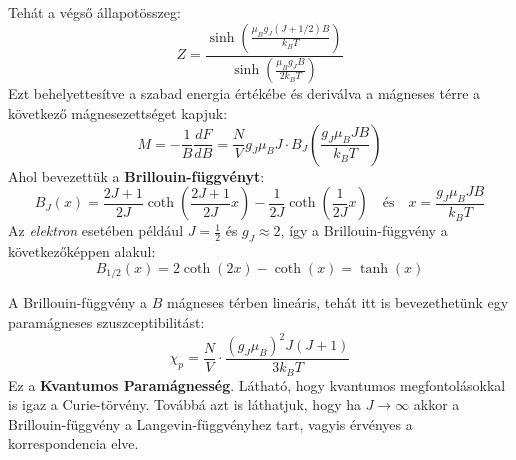\documentclass[../main.tex]{subfiles}
\begin{document}
Tehát a végső állapotösszeg:
\begin{equation}
    Z = \frac{\sinh \left( \frac{\mu_B g_J (J+1/2) B}{k_B T} \right)}{\sinh \left( \frac{\mu_B g_J B}{2 k_B T} \right)}
\end{equation}
Ezt behelyettesítve a szabad energia értékébe és deriválva a mágneses térre a következő mágnesezettséget kapjuk:
\begin{equation}
    M = - \frac{1}{B} \frac{dF}{dB} = \frac{N}{V} g_J \mu_B J \cdot B_J \left( \frac{g_J \mu_B J B}{k_B T} \right)
\end{equation}
Ahol bevezettük a \textbf{Brillouin-függvényt}:
\begin{equation}
    B_J(x) = \frac{2J+1}{2J} \coth \left( \frac{2J+1}{2J} x \right) - \frac{1}{2J} \coth \left( \frac{1}{2J} x \right) \quad \text{és} \quad x = \frac{g_J \mu_B J B}{k_B T}
\end{equation}
Az \textit{elektron} esetében például $J = \frac{1}{2}$ és $g_J \approx 2$, így a Brillouin-függvény a következőképpen alakul:
\begin{equation}
    B_{1/2}(x) = 2 \coth(2x) - \coth(x) = \tanh(x)
\end{equation}

A Brillouin-függvény a $B$ mágneses térben lineáris, tehát itt is bevezethetünk egy paramágneses szuszceptibilitást:
\begin{equation}
    \chi_{p} = \frac{N}{V} \cdot \frac{(g_J \mu_B)^2 J(J+1)}{3 k_B T}
\end{equation}
Ez a \textbf{Kvantumos Paramágnesség}. Látható, hogy kvantumos megfontolásokkal is igaz a Curie-törvény. Továbbá azt is láthatjuk, hogy ha $J \to \infty$ akkor a Brillouin-függvény a Langevin-függvényhez tart, vagyis érvényes a korrespondencia elve.
\end{document}
